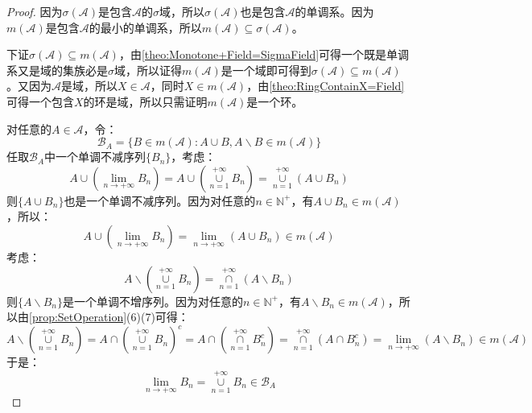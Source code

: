 \begin{proof}
	因为$\sigma(\mathscr{A})$是包含$\mathscr{A}$的$\sigma$域，所以$\sigma(\mathscr{A})$也是包含$\mathscr{A}$的单调系。因为$m(\mathscr{A})$是包含$\mathscr{A}$的最小的单调系，所以$m(\mathscr{A})\subseteq\sigma(\mathscr{A})$。\par
	下证$\sigma(\mathscr{A})\subseteq m(\mathscr{A})$，由\cref{theo:Monotone+Field=SigmaField}可得一个既是单调系又是域的集族必是$\sigma$域，所以证得$m(\mathscr{A})$是一个域即可得到$\sigma(\mathscr{A})\subseteq m(\mathscr{A})$。又因为$\mathscr{A}$是域，所以$X\in\mathscr{A}$，同时$X\in m(\mathscr{A})$，由\cref{theo:RingContainX=Field}可得一个包含$X$的环是域，所以只需证明$m(\mathscr{A})$是一个环。\par
	对任意的$A\in \mathscr{A}$，令：
	\begin{equation*}
		\mathscr{B}_A=\{B\in m(\mathscr{A}):A\cup B,A\backslash B\in m(\mathscr{A})\}
	\end{equation*}
	任取$\mathscr{B}_A$中一个单调不减序列$\{B_n\}$，考虑：
	\begin{equation*}
		A\cup\left(\lim_{n\to+\infty}B_n\right)=A\cup\left(\underset{n=1}{\overset{+\infty}{\cup}}B_n\right)
		=\underset{n=1}{\overset{+\infty}{\cup}}(A\cup B_n)
	\end{equation*}
	则$\{A\cup B_n\}$也是一个单调不减序列。因为对任意的$n\in\mathbb{N}^+$，有$A\cup B_n\in m(\mathscr{A})$，所以：
	\begin{equation*}
		A\cup\left(\lim_{n\to+\infty}B_n\right)=\lim_{n\to+\infty}(A\cup B_n)\in m(\mathscr{A})
	\end{equation*}
	考虑：
	\begin{equation*}
		A\backslash\left(\underset{n=1}{\overset{+\infty}{\cup}}B_n\right)
		=\underset{n=1}{\overset{+\infty}{\cap}}(A\backslash B_n)
	\end{equation*}
	则$\{A\backslash B_n\}$是一个单调不增序列。因为对任意的$n\in\mathbb{N}^+$，有$A\backslash B_n\in m(\mathscr{A})$，所以由\cref{prop:SetOperation}(6)(7)可得：
	\begin{equation*}
		A\backslash\left(\underset{n=1}{\overset{+\infty}{\cup}}B_n\right)=A\cap\left(\underset{n=1}{\overset{+\infty}{\cup}}B_n\right)^c=A\cap\left(\underset{n=1}{\overset{+\infty}{\cap}}B_n^c\right)=\underset{n=1}{\overset{+\infty}{\cap}}(A\cap B_n^c)=\lim_{n\to+\infty}(A\backslash B_n)\in m(\mathscr{A})
	\end{equation*}
	于是：
	\begin{equation*}
		\lim_{n\to+\infty}B_n=\underset{n=1}{\overset{+\infty}{\cup}}B_n\in\mathscr{B}_A

\end{equation*}
\end{proof}
